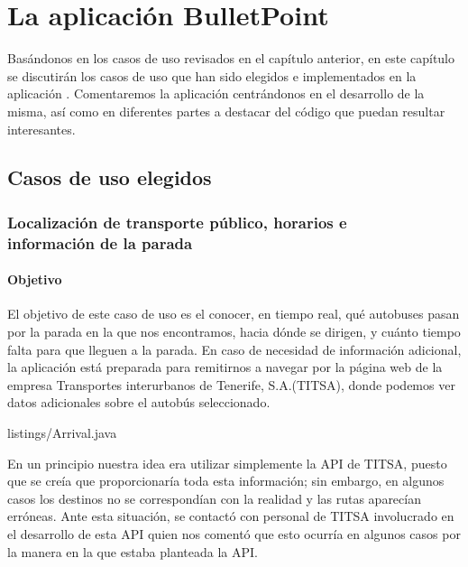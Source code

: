 %
%
%

\chapter{La aplicación BulletPoint} \label{chap:LaAplicacion} 

Basándonos en los casos de uso revisados en el capítulo anterior, en este capítulo se discutirán los casos de uso que han sido elegidos e implementados en la aplicación \BulletPoint{}. Comentaremos la aplicación centrándonos en el desarrollo de la misma, así como  en diferentes partes a destacar del código que puedan resultar interesantes.


\section{Casos de uso elegidos}

\subsection{Localización de transporte público, horarios e \\información de la parada}

\subsubsection{Objetivo}


El objetivo de este caso de uso es el conocer, en tiempo real, qué autobuses pasan por la parada en la que nos encontramos, hacia dónde se dirigen, y cuánto tiempo falta para que lleguen a la parada. En caso de necesidad de información adicional, la aplicación está preparada para remitirnos a navegar por la página web \cite{URL::titsa} de la empresa Transportes interurbanos de Tenerife, S.A.(TITSA), donde podemos ver datos adicionales sobre el autobús seleccionado.



{listings/Arrival.java} %

En un principio nuestra idea era utilizar simplemente la API de TITSA, puesto que se creía que proporcionaría toda esta información; sin embargo, en algunos casos los destinos no se correspondían con la realidad y las rutas aparecían erróneas. Ante esta situación, se contactó con personal de  TITSA involucrado en el desarrollo de esta API quien nos comentó que esto ocurría en algunos casos por la manera en la que estaba planteada la API.


